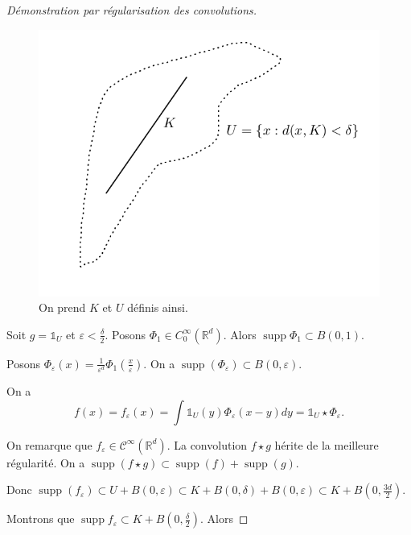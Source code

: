 \documentclass[french]{book}
\theoremstyle{definition}
\theoremstyle{remark}
\newcommand{\lesss}{<}
\newcommand{\less}{\lesss}
\begin{document}
\begin{proof}[Démonstration par régularisation des convolutions]
  \begin{figure}[h!]
    \centering
    \includegraphics[scale=0.3]{figures/reg_conv.png}
    \caption{On prend \(K\) et \(U\) définis ainsi.}
    \label{}
  \end{figure}

  Soit \(g = \mathds{1}_{U}\) et \(\varepsilon \less \frac{\delta}{2}\). Posons \(\Phi_1 \in C _{0}^{\infty}(\mathbb{R}^d)\). Alors \(\operatorname{supp}\Phi_1 \subset B(0,1)\).

  Posons \(\Phi _{\varepsilon}(x) = \frac{1}{\varepsilon ^{d}}\Phi_1 \left(\frac{x}{\varepsilon}\right)\). On a \(\operatorname{supp}(\Phi _{\varepsilon}) \subset B(0,\varepsilon)\).

  On a \[f(x) = f _{\varepsilon}(x) = \int \mathds{1}_{U}(y)\Phi _{\varepsilon}(x-y)dy = \mathds{1}_{U} \star \Phi _{\varepsilon}.\]

  On remarque que \(f _{\varepsilon} \in \mathcal{C}^{\infty}(\mathbb{R}^{d})\). La convolution \(f \star g\) hérite de la meilleure régularité. On  a \(\operatorname{supp}(f \star g) \subset \operatorname{supp}(f) + \operatorname{supp}(g)\).

  Donc \(\operatorname{supp}(f _{\varepsilon}) \subset U + B(0,\varepsilon) \subset K + B(0,\delta)+ B(0,\varepsilon)\subset K+ B \left(0, \frac{3 d}{2}\right)\).

  Montrons que \(\operatorname{supp}f _{\varepsilon}\subset K + B \left(0, \frac{\delta}{2}\right)\). Alors


\end{proof}
\end{document}
